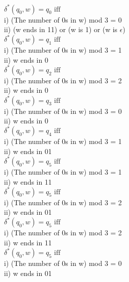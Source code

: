 \documentclass{article}
\begin{document}
\begin{enumerate}
\begin{enumerate}
      $ \delta^\ast(q_0, w) = q_0 \mbox{ iff } $ \\
      i) (The number of 0s in w) mod 3 = 0 \\
      ii) (w ends in 11) or (w is 1) or (w is $\epsilon$) \\

      $ \delta^\ast(q_0, w) = q_1 \mbox{ iff } $ \\
      i) (The number of 0s in w) mod 3 = 1 \\
      ii) w ends in 0 \\

      $ \delta^\ast(q_0, w) = q_2 \mbox{ iff } $ \\
      i) (The number of 0s in w) mod 3 = 2 \\
      ii) w ends in 0 \\

      $ \delta^\ast(q_0, w) = q_3 \mbox{ iff } $ \\
      i) (The number of 0s in w) mod 3 = 0 \\
      ii) w ends in 0 \\

      $ \delta^\ast(q_0, w) = q_4 \mbox{ iff } $ \\
      i) (The number of 0s in w) mod 3 = 1 \\
      ii) w ends in 01 \\

      $ \delta^\ast(q_0, w) = q_5 \mbox{ iff } $ \\
      i) (The number of 0s in w) mod 3 = 1 \\
      ii) w ends in 11 \\

      $ \delta^\ast(q_0, w) = q_5 \mbox{ iff } $ \\
      i) (The number of 0s in w) mod 3 = 2 \\
      ii) w ends in 01 \\

      $ \delta^\ast(q_0, w) = q_5 \mbox{ iff } $ \\
      i) (The number of 0s in w) mod 3 = 2 \\
      ii) w ends in 11 \\

      $ \delta^\ast(q_0, w) = q_5 \mbox{ iff } $ \\
      i) (The number of 0s in w) mod 3 = 0 \\
      ii) w ends in 01 \\



\end{enumerate}
\end{enumerate}
\end{document}
